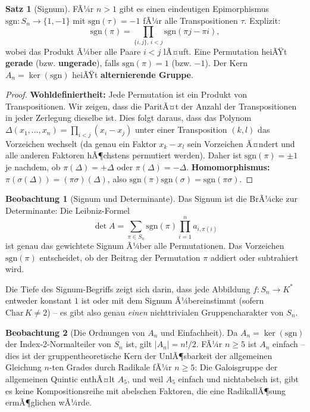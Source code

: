 ﻿\documentclass[a4paper,12pt]{report}
\theoremstyle{definition}
\newtheorem{satz}{Satz}
\newtheorem{beobachtung}{Beobachtung}
\begin{document}
\begin{satz}[Signum]
    FÃ¼r $n > 1$ gibt es einen eindeutigen Epimorphismus
    $\mathrm{sgn} : S_n \to \{1, -1\}$ mit $\mathrm{sgn}(\tau) = -1$
    fÃ¼r alle Transpositionen $\tau$. Explizit:
    \[
        \mathrm{sgn}(\pi) = \prod_{\{i,j\},\, i < j}
        \mathrm{sgn}(\pi j - \pi i),
    \]
    wobei das Produkt Ã¼ber alle Paare $i < j$ lÃ¤uft.
    Eine Permutation heiÃŸt \textbf{gerade} (bzw. \textbf{ungerade}),
    falls $\mathrm{sgn}(\pi) = 1$ (bzw. $-1$).
    Der Kern $A_n = \ker(\mathrm{sgn})$ heiÃŸt \textbf{alternierende Gruppe}.
\end{satz}
\begin{proof}
    \textbf{Wohldefiniertheit:} Jede Permutation ist ein Produkt von Transpositionen.
    Wir zeigen, dass die ParitÃ¤t der Anzahl der Transpositionen in jeder Zerlegung
    dieselbe ist. Dies folgt daraus, dass das Polynom
    $\Delta(x_1,\ldots,x_n) = \prod_{i<j}(x_i - x_j)$ unter einer Transposition
    $(k,l)$ das Vorzeichen wechselt (da genau ein Faktor $x_k - x_l$ sein Vorzeichen
    Ã¤ndert und alle anderen Faktoren hÃ¶chstens permutiert werden).
    Daher ist $\mathrm{sgn}(\pi) = \pm 1$ je nachdem, ob $\pi(\Delta) = +\Delta$
    oder $\pi(\Delta) = -\Delta$.
    \textbf{Homomorphismus:} $\pi(\sigma(\Delta)) = (\pi\sigma)(\Delta)$, also
    $\mathrm{sgn}(\pi)\mathrm{sgn}(\sigma) = \mathrm{sgn}(\pi\sigma)$.
\end{proof}

\begin{beobachtung}[Signum und Determinante]
    Das Signum ist die BrÃ¼cke zur Determinante: Die Leibniz-Formel
    \[
        \det A = \sum_{\pi \in S_n} \mathrm{sgn}(\pi) \prod_{i=1}^n a_{i,\pi(i)}
    \]
    ist genau das gewichtete Signum Ã¼ber alle Permutationen.
    Das Vorzeichen $\mathrm{sgn}(\pi)$ entscheidet, ob der Beitrag
    der Permutation $\pi$ addiert oder subtrahiert wird.

    Die Tiefe des Signum-Begriffs zeigt sich darin, dass jede
    Abbildung $f : S_n \to K^*$ entweder konstant $1$ ist oder
    mit dem Signum Ã¼bereinstimmt (sofern $\mathrm{Char}\, K \neq 2$) --
    es gibt also genau \emph{einen} nichttrivialen Gruppencharakter von $S_n$.
\end{beobachtung}

\begin{beobachtung}[Die Ordnungen von $A_n$ und Einfachheit]
    Da $A_n = \ker(\mathrm{sgn})$ der Index-2-Normalteiler von $S_n$ ist,
    gilt $|A_n| = n!/2$. FÃ¼r $n \geq 5$ ist $A_n$ einfach -- dies
    ist der gruppentheoretische Kern der UnlÃ¶sbarkeit der allgemeinen
    Gleichung $n$-ten Grades durch Radikale fÃ¼r $n \geq 5$: Die
    Galoisgruppe der allgemeinen Quintic enthÃ¤lt $A_5$, und weil
    $A_5$ einfach und nichtabelsch ist, gibt es keine
    Kompositionsreihe mit abelschen Faktoren, die eine RadikallÃ¶sung
    ermÃ¶glichen wÃ¼rde.
\end{beobachtung}
\end{document}
